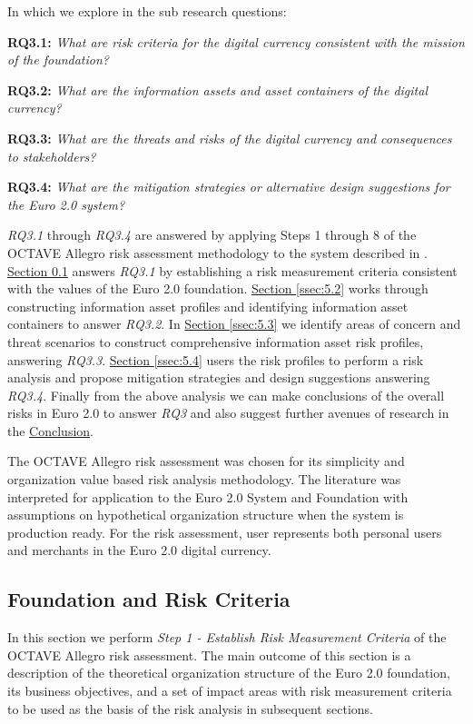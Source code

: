 \documentclass[12pt]{article} %
\newcommand{\hypernameref}[1]{\hyperref[#1]{\nameref{#1}}}
\newcommand{\hypersectionref}[1]{\hyperref[#1]{Section \ref{#1}}}
\begin{document}
{In which we explore in the sub research questions:
\begin{quoting}
	\textbf{RQ3.1: }\textit{What are risk criteria for the digital currency consistent with the mission of the foundation?}
\end{quoting}
\begin{quoting}
	\textbf{RQ3.2: }\textit{What are the information assets and asset containers of the digital currency?}
\end{quoting}
\begin{quoting}
	\textbf{RQ3.3: }\textit{What are the threats and risks of the digital currency and consequences to stakeholders?}
\end{quoting}
\begin{quoting}
	\textbf{RQ3.4: }\textit{What are the mitigation strategies or alternative design suggestions for the Euro 2.0 system?}
\end{quoting}

\textit{RQ3.1} through \textit{RQ3.4} are answered by applying Steps 1 through 8 of the OCTAVE Allegro risk assessment methodology\cite{CaralliIntroducingOCTAVE2007} to the system described in \hypernameref{sec:3}. \hypersectionref{ssec:5.1} answers \textit{RQ3.1} by establishing a risk measurement criteria consistent with the values of the Euro 2.0 foundation. \hypersectionref{ssec:5.2} works through constructing information asset profiles and identifying information asset containers to answer \textit{RQ3.2}. In \hypersectionref{ssec:5.3} we identify areas of concern and threat scenarios to construct comprehensive information asset risk profiles, answering \textit{RQ3.3}. \hypersectionref{ssec:5.4} users the risk profiles to perform a risk analysis and propose mitigation strategies and design suggestions answering \textit{RQ3.4}. Finally from the above analysis we can make conclusions of the overall risks in Euro 2.0 to answer \textit{RQ3} and also suggest further avenues of research in the \hyperref[ssec:5.5]{Conclusion}.

The OCTAVE Allegro risk assessment was chosen for its simplicity and organization value based risk analysis methodology. The literature was interpreted for application to the Euro 2.0 System and Foundation with assumptions on hypothetical organization structure when the system is production ready. For the risk assessment, user represents both personal users and merchants in the Euro 2.0 digital currency.

\subsection{Foundation and Risk Criteria} \label{ssec:5.1}
In this section we perform \textit{Step 1 - Establish Risk Measurement Criteria} of the OCTAVE Allegro risk assessment. The main outcome of this section is a description of the theoretical organization structure of the Euro 2.0 foundation, its business objectives, and a set of impact areas with risk measurement criteria to be used as the basis of the risk analysis in subsequent sections.

}
\end{document}
